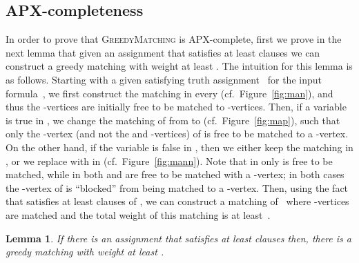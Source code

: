 \documentclass[a4paper,11pt]{article}
\newtheorem{lemma}{Lemma}
\newcommand{\greedy}{\textsc{GreedyMatching}\xspace}
\begin{document}
\subsection{APX-completeness\label{APX-subsec}} 
  
In order to prove that \greedy is APX-complete, first we prove in the next lemma that given an assignment that satisfies at least  
clauses we can construct a greedy matching with weight at least . 
The intuition for this lemma is as follows. Starting with a given satisfying 
truth assignment~ for the input formula~, we first construct the 
matching  in every  (cf.~Figure~\ref{fig:man}), and thus the
-vertices are initially free to be matched to -vertices. Then, if a 
variable  is true in , we change the matching of  from 
 to  (cf.~Figure~\ref{fig:map}), such that only the -vertex 
(and not the  and -vertices) of  is free to be 
matched to a -vertex. On the other hand, if the variable  is false in 
, then we either keep the matching  in , or we replace
 with  in  (cf.~Figure~\ref{fig:mann}). Note that in 
 only  is free to be matched, while in  both 
 and  are free to be matched with a -vertex; in 
both cases the -vertex of  is ``blocked'' from being 
matched to a -vertex. Then, using the fact that  satisfies at least  clauses 
of , we can construct a matching of~ where  -vertices are matched 
and the total weight of this matching is at least~.


\begin{lemma}
\label{lem:one}
If there is an assignment that satisfies at least  clauses then, there is a greedy 
matching with weight at least .
\end{lemma}
\end{document}
